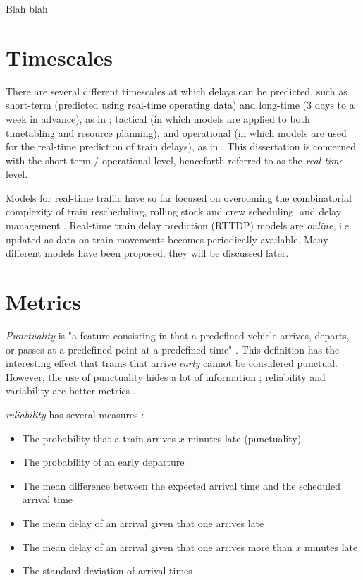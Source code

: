 \documentclass{article}
\begin{document}
Blah blah


\section{Timescales}

There are several different timescales at which delays can be predicted, such as short-term (predicted using real-time operating data) and long-time (3 days to a week in advance), as in \cite{wang_zhang_2019};
tactical (in which models are applied to both timetabling and resource planning), and operational (in which models are used for the real-time prediction of train delays), as in \cite{markovic_milinkovic_tikhonov_schonfeld_2015}. This dissertation is concerned with the short-term / operational level, henceforth referred to as the \textit{real-time} level. 

Models for real-time traffic have so far focused on overcoming the combinatorial complexity of train rescheduling, rolling stock and crew scheduling, and delay management \cite{kecman_corman_meng_2015}.
Real-time train delay prediction (RTTDP) models are \textit{online}, i.e. updated as data on train movements becomes periodically available.  Many different models have been proposed; they will be discussed later.

\section{Metrics}

\textit{Punctuality} is "a feature consisting in that a predefined vehicle arrives, departs, or passes at a predefined point at a predefined time" \cite{rudnicki_1997}. This definition has the interesting effect that trains 
that arrive \textit{early} cannot be considered punctual. However, the use of punctuality hides a lot of information \cite{skagestad_2004}; reliability and variability are better metrics \cite{olsson_haugland_2004}.

\textit{reliability} has several measures \cite{rietveld_bruinsma_van_vuuren_2001}:

\begin{itemize}
	\item The probability that a train arrives $x$ minutes late (punctuality)
	\item The probability of an early departure
	\item The mean difference between the expected arrival time and the scheduled arrival time
	\item The mean delay of an arrival given that one arrives late
	\item The mean delay of an arrival given that one arrives more than $x$ minutes late
	\item The standard deviation of arrival times
\end{itemize}
\end{document}
